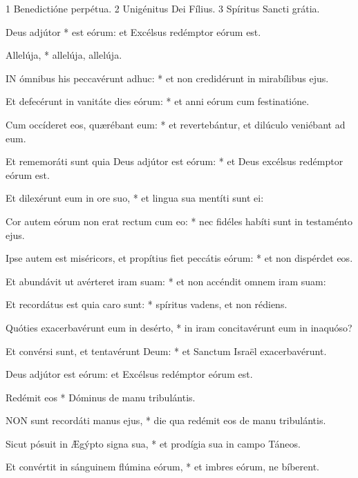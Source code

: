  1 Benedictióne perpétua. 2 Unigénitus Dei Fílius. 3 Spíritus Sancti grátia.



 Deus adjútor * est eórum: et Excélsus redémptor eórum est.


 Allelúja, * allelúja, allelúja.


\lettrine[lines=2]{I}{N} ómnibus his peccavérunt adhuc: * et non credidérunt in mirabílibus ejus.

Et defecérunt in vanitáte dies eórum: * et anni eórum cum festinatióne.

Cum occíderet eos, quærébant eum: * et revertebántur, et dilúculo veniébant ad eum.

Et rememoráti sunt quia Deus adjútor est eórum: * et Deus excélsus redémptor eórum est.

Et dilexérunt eum in ore suo, * et lingua sua mentíti sunt ei:

Cor autem eórum non erat rectum cum eo: * nec fidéles habíti sunt in testaménto ejus.

Ipse autem est miséricors, et propítius fiet peccátis eórum: * et non dispérdet eos.

Et abundávit ut avérteret iram suam: * et non accéndit omnem iram suam:

Et recordátus est quia caro sunt: * spíritus vadens, et non rédiens.

Quóties exacerbavérunt eum in desérto, * in iram concitavérunt eum in inaquóso?

Et convérsi sunt, et tentavérunt Deum: * et Sanctum Israël exacerbavérunt.

 Deus adjútor est eórum: et Excélsus redémptor eórum est.

 Redémit eos * Dóminus de manu tribulántis.


\lettrine[lines=2]{N}{ON} sunt recordáti manus ejus, * die qua redémit eos de manu tribulántis.

Sicut pósuit in Ægýpto signa sua, * et prodígia sua in campo Táneos.

Et convértit in sánguinem flúmina eórum, * et imbres eórum, ne bíberent.


